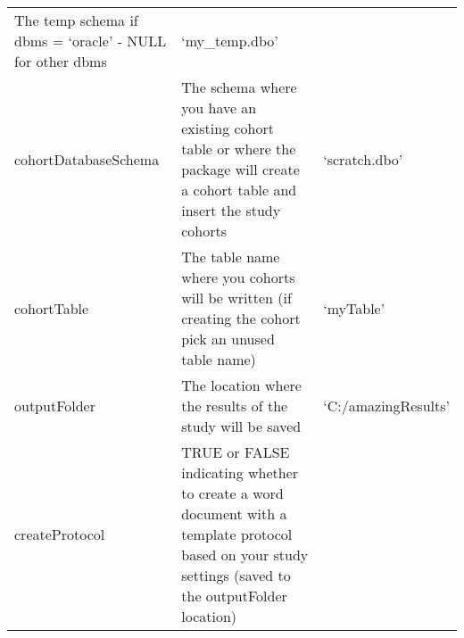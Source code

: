\documentclass[
]{article}
\begin{document}
\begin{longtable}[]{@{}lll@{}}
\begin{minipage}[t]{0.46\columnwidth}
The temp schema if dbms = `oracle' - NULL for other dbms\strut
\end{minipage} & \begin{minipage}[t]{0.24\columnwidth}\raggedright
`my\_temp.dbo'\strut
\end{minipage}\tabularnewline
\begin{minipage}[t]{0.21\columnwidth}\raggedright
cohortDatabaseSchema\strut
\end{minipage} & \begin{minipage}[t]{0.46\columnwidth}\raggedright
The schema where you have an existing cohort table or where the package
will create a cohort table and insert the study cohorts\strut
\end{minipage} & \begin{minipage}[t]{0.24\columnwidth}\raggedright
`scratch.dbo'\strut
\end{minipage}\tabularnewline
\begin{minipage}[t]{0.21\columnwidth}\raggedright
cohortTable\strut
\end{minipage} & \begin{minipage}[t]{0.46\columnwidth}\raggedright
The table name where you cohorts will be written (if creating the cohort
pick an unused table name)\strut
\end{minipage} & \begin{minipage}[t]{0.24\columnwidth}\raggedright
`myTable'\strut
\end{minipage}\tabularnewline
\begin{minipage}[t]{0.21\columnwidth}\raggedright
outputFolder\strut
\end{minipage} & \begin{minipage}[t]{0.46\columnwidth}\raggedright
The location where the results of the study will be saved\strut
\end{minipage} & \begin{minipage}[t]{0.24\columnwidth}\raggedright
`C:/amazingResults'\strut
\end{minipage}\tabularnewline
\begin{minipage}[t]{0.21\columnwidth}\raggedright
createProtocol\strut
\end{minipage} & \begin{minipage}[t]{0.46\columnwidth}\raggedright
TRUE or FALSE indicating whether to create a word document with a
template protocol based on your study settings (saved to the
outputFolder location)\strut
\end{minipage} & \begin{minipage}[t]{0.24\columnwidth}\raggedright

\end{minipage}
\end{longtable}
\end{document}
